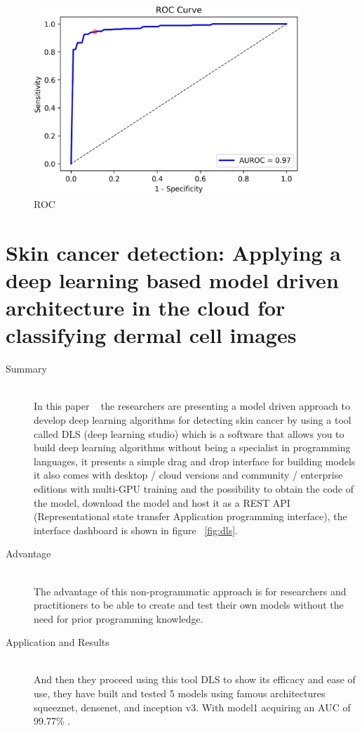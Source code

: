 \begin{figure}[htbp]
\begin{center}
\includegraphics[width=10cm]{./chapter-03-state-of-the-art/ROC.png}
\end{center}
\caption{ROC}
\label{fig:roc}
\end{figure}







\section{Skin cancer detection: Applying a deep learning based model driven architecture in the cloud for classifying dermal cell images}
\begin{description}
\item[Summary] \hfill \\
In this paper ~\cite{Kadampur2020} the researchers are presenting a model driven approach to develop deep learning algorithms for detecting skin cancer by using a tool called DLS (deep learning studio) which is a software that allows you to build deep learning algorithms without being a specialist in programming languages, it presents a simple drag and drop interface for building models it also comes with desktop / cloud versions and community / enterprise editions with multi-GPU training and the possibility to obtain the code of the model, download the model and host it as a REST API (Representational state transfer Application programming interface), the interface dashboard is shown in figure ~\ref{fig:dls}.
\item[Advantage] \hfill \\
The advantage of this non-programmatic approach is for researchers and practitioners to be able to create and test their own models without the need for prior programming knowledge.
\item[Application and Results] \hfill \\
And then they proceed using this tool DLS to show its efficacy and ease of use, they have built and tested 5 models using famous architectures squeeznet, densenet, and inception v3.
With model1 acquiring an AUC of 99.77\% .
\end{description}


